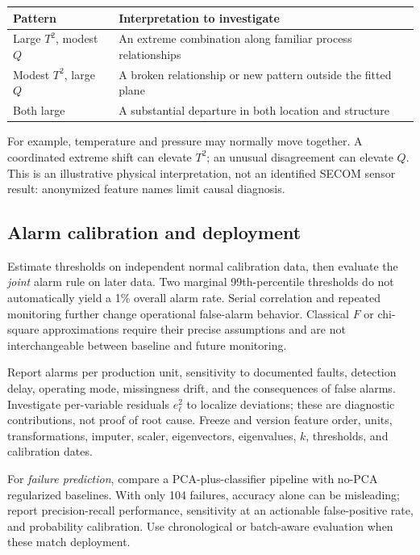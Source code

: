 \documentclass[11pt]{article}
\begin{document}
\begin{center}\begin{tabular}{p{.22\linewidth}p{.65\linewidth}}\toprule
Pattern & Interpretation to investigate\\\midrule
Large $T^2$, modest $Q$ & An extreme combination along familiar process relationships\\
Modest $T^2$, large $Q$ & A broken relationship or new pattern outside the fitted plane\\
Both large & A substantial departure in both location and structure\\\bottomrule
\end{tabular}\end{center}
For example, temperature and pressure may normally move together. A coordinated extreme shift can elevate $T^2$; an unusual disagreement can elevate $Q$. This is an illustrative physical interpretation, not an identified SECOM sensor result: anonymized feature names limit causal diagnosis.

\subsection{Alarm calibration and deployment}
Estimate thresholds on independent normal calibration data, then evaluate the \emph{joint} alarm rule on later data. Two marginal 99th-percentile thresholds do not automatically yield a 1\% overall alarm rate. Serial correlation and repeated monitoring further change operational false-alarm behavior. Classical $F$ or chi-square approximations require their precise assumptions and are not interchangeable between baseline and future monitoring.

Report alarms per production unit, sensitivity to documented faults, detection delay, operating mode, missingness drift, and the consequences of false alarms. Investigate per-variable residuals $e_\ell^2$ to localize deviations; these are diagnostic contributions, not proof of root cause. Freeze and version feature order, units, transformations, imputer, scaler, eigenvectors, eigenvalues, $k$, thresholds, and calibration dates.

For \emph{failure prediction}, compare a PCA-plus-classifier pipeline with no-PCA regularized baselines. With only 104 failures, accuracy alone can be misleading; report precision-recall performance, sensitivity at an actionable false-positive rate, and probability calibration. Use chronological or batch-aware evaluation when these match deployment.
\end{document}
